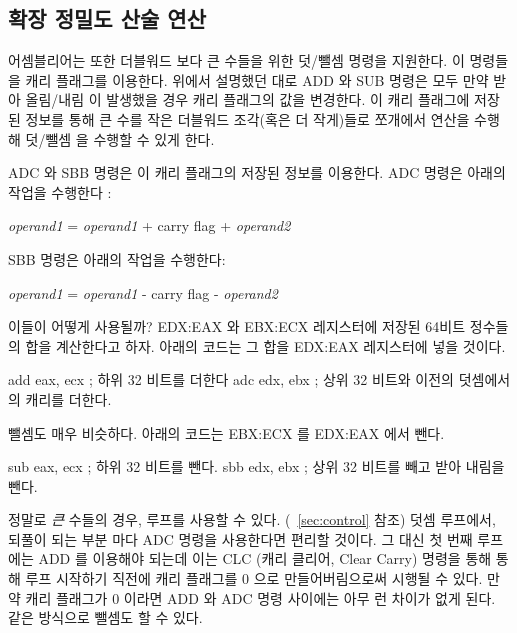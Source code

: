 \subsection{확장 정밀도 산술 연산}\label{sec:ExtPrecArith} 

어셈블리어는 또한 더블워드 보다 큰 수들을 위한 덧/뺄셈 명령을 지원한다. 
이 명령들을 캐리 플래그를 이용한다. 위에서 설명했던 대로 {\code ADD} 
 와 {\code SUB} 명령은 모두 만약 받아 올림/내림 
이 발생했을 경우 캐리 플래그의 값을 변경한다. 이 캐리 플래그에 저장된
정보를 통해 큰 수를 작은 더블워드 조각(혹은 더 작게)들로 쪼개에서 연산을 수행해 덧/뺄셈
을 수행할 수 있게 한다. 

{\code ADC} 와 {\code SBB} 명령은 이 캐리 플래그의 
저장된 정보를 이용한다. {\code ADC} 명령은 아래의 작업을 수행한다 :

\begin{center}
{\code \emph{operand1} = \emph{operand1} + carry flag + \emph{operand2} }
\end{center}
{\code SBB} 명령은 아래의 작업을 수행한다:
\begin{center}
{\code \emph{operand1} = \emph{operand1} - carry flag - \emph{operand2} }
\end{center}
이들이 어떻게 사용될까? EDX:EAX  와 EBX:ECX 레지스터에
저장된 64비트 정수들의 합을 계산한다고 하자. 아래의 코드는 그 합을 EDX:EAX 
레지스터에 넣을 것이다. 

\begin{AsmCodeListing}[frame=none]
      add    eax, ecx       ; 하위 32 비트를 더한다 
      adc    edx, ebx       ; 상위 32 비트와 이전의 덧셈에서의 캐리를 더한다. 
\end{AsmCodeListing}
뺄셈도 매우 비슷하다. 아래의 코드는 EBX:ECX 를 EDX:EAX 에서 뺀다. 

\begin{AsmCodeListing}[frame=none]
      sub    eax, ecx       ; 하위 32 비트를 뺀다. 
      sbb    edx, ebx       ; 상위 32 비트를 빼고 받아 내림을 뺀다. 
\end{AsmCodeListing}

정말로 \emph{큰} 수들의 경우, 루프를 사용할 수 있다. (~\ref{sec:control} 참조) 
덧셈 루프에서, 되풀이 되는 부분 마다 {\code ADC} 명령을 사용한다면 
편리할 것이다. 그 대신 첫 번째 루프에는 {\code ADD} 를 이용해야 되는데 이는
{\code CLC}  (캐리 클리어, Clear Carry) 명령을 통해 통해 루프
시작하기 직전에 캐리 플래그를 0 으로 만들어버림으로써 시행될 수 있다. 
만약 캐리 플래그가 0 이라면 {\code ADD} 와 {\code ADC} 명령 사이에는 아무
런 차이가 없게 된다. 같은 방식으로 뺄셈도 할 수 있다. 

